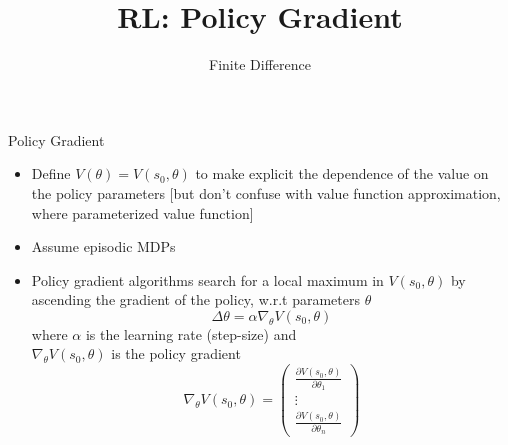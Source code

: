 


\title[Reinforcement Learning: Big Picture]{RL: Policy Gradient}
\subtitle{Finite Difference}




	
	\maketitle

\begin{frame}[c]{Policy Gradient}

\begin{itemize}
	\item Define $V(\theta) = V(s_0, \theta)$ to make explicit the dependence of the value on the policy parameters [but don't confuse with value function approximation, where parameterized value function]
	\item Assume episodic MDPs 
	\item Policy gradient algorithms search for a \alert{local} maximum in $V(s_0,\theta)$ by ascending the gradient of the policy, w.r.t parameters $\theta$
	$$\Delta \theta = \alpha \nabla_\theta V(s_0, \theta) $$
	where $\alpha$ is the learning rate (step-size) and\\ $\nabla_\theta V(s_0, \theta)$ is the policy gradient
	$$\nabla_\theta V(s_0, \theta) = \begin{pmatrix}
	\frac{\partial V(s_0, \theta)}{\partial \theta_1}\\
	\vdots\\
	\frac{\partial V(s_0, \theta)}{\partial \theta_n}
	\end{pmatrix} $$
	
\end{itemize}

\end{frame}
